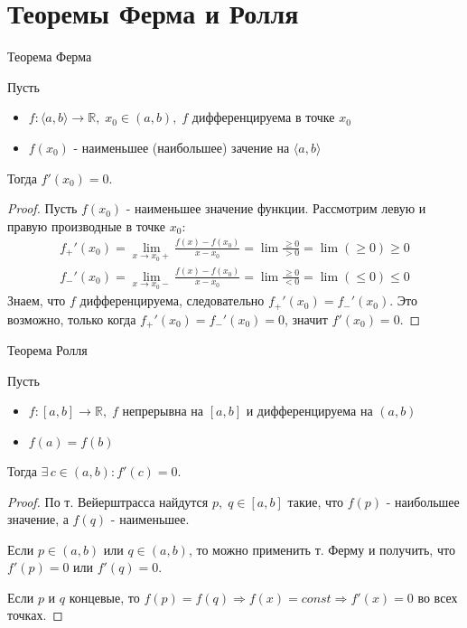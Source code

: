 \section{Теоремы Ферма и Ролля \href{https://youtu.be/OXDjegAsmSU?t=4968}{\Walley}}
\begin{theorem-non}
    Теорема Ферма

    Пусть
    \begin{itemize}
        \item $f: \langle a, b \rangle \to \mathbb{R}, \; x_0 \in (a, b), \; f$ дифференцируема в точке $x_0$
        \item $f(x_0)$ - наименьшее (наибольшее) зачение на $\langle a, b \rangle$
    \end{itemize}
    Тогда $f'(x_0) = 0$.
\end{theorem-non}
\begin{proof}
    Пусть $f(x_0)$ - наименьшее значение функции. Рассмотрим левую и правую производные в точке $x_0$:
    \begin{gather*}
        f_+'(x_0) = \lim_{x \to x_0+} \frac{f(x) - f(x_0)}{x - x_0} = \lim \frac{\geqslant 0}{> 0} = \lim (\geqslant 0) \geqslant 0 \\
        f_-'(x_0) = \lim_{x \to x_0-} \frac{f(x) - f(x_0)}{x - x_0} = \lim \frac{\geqslant 0}{< 0} = \lim (\leqslant 0) \leqslant 0 
    \end{gather*}   
    Знаем, что $f$ дифференцируема, следовательно $f_+'(x_0) = f_-'(x_0)$. Это возможно, только когда $f_+'(x_0) = f_-'(x_0) = 0$, значит $f'(x_0) = 0$.
\end{proof}

\begin{theorem-non}
    Теорема Ролля

    Пусть 
    \begin{itemize}
        \item $f: [a, b] \to \mathbb{R}, \; f$ непрерывна на $[a, b]$ и дифференцируема на $(a, b)$
        \item $f(a) = f(b)$
    \end{itemize}
    Тогда $\exists \, c \in (a, b) : f'(c) = 0$.
\end{theorem-non}
\begin{proof}
    По т. Вейерштрасса найдутся $p, \; q \in [a, b]$ такие, что $f(p)$ - наибольшее значение, а $f(q)$ - наименьшее.
    
    Если $p \in (a, b)$ или $q \in (a, b)$, то можно применить т. Ферму и получить, что $f'(p) = 0$ или $f'(q) = 0$.

    Если $p$ и $q$ концевые, то $f(p) = f(q) \Rightarrow f(x) = const \Rightarrow f'(x) = 0$ во всех точках.
\end{proof}